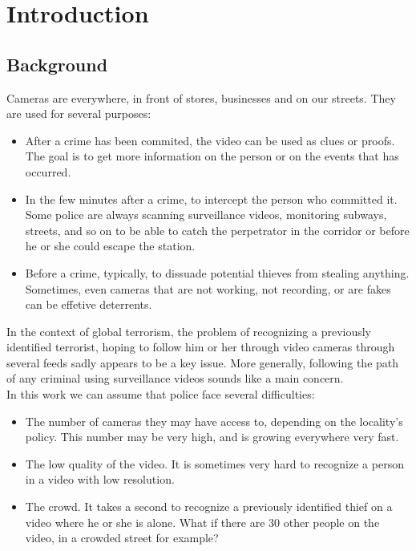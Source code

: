 \setlength{\footskip}{8mm}
\chapter{Introduction}

\section{Background}


Cameras are everywhere, in front of stores, businesses and on our streets. They are used for several purposes:\begin{itemize}
\item After a crime has been commited, the video can be used as clues or proofs. The goal is to get more information on the person or on the events that has occurred.
\item In the few minutes after a crime, to intercept the person who committed it. Some police are always scanning surveillance videos, monitoring subways, streets, and so on to be able to catch the perpetrator in the corridor or before he or she could escape the station.
\item Before a crime, typically, to dissuade potential thieves from stealing anything. Sometimes, even cameras that are not working, not recording, or are fakes can be effetive deterrents.
\end{itemize}

In the context of global terrorism, the problem of recognizing a previously identified terrorist, hoping to follow him or her through video cameras through several feeds sadly appears to be a key issue. More generally, following the path of any criminal using surveillance videos sounds like a main concern.\\

In this work we can assume that police face several difficulties:\begin{itemize}
\item The number of cameras they may have access to, depending on the locality's policy. This number may be very high, and is growing everywhere very fast.
\item The low quality of the video. It is sometimes very hard to recognize a person in a video with low resolution.
\item The crowd. It takes a second to recognize a previously identified thief on a video where he or she is alone. What if there are 30 other people on the video, in a crowded street for example?
\end{itemize}

